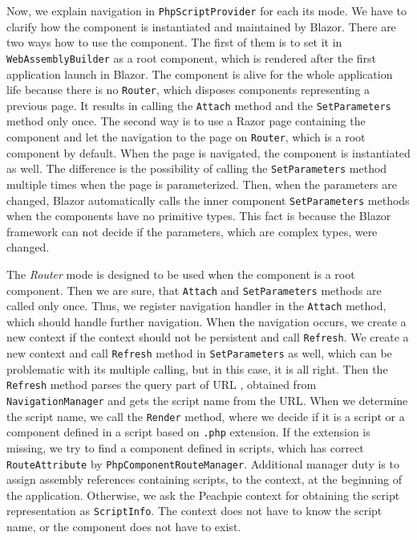 Now, we explain navigation in \texttt{PhpScriptProvider} for each its mode.
We have to clarify how the component is instantiated and maintained by Blazor.
There are two ways how to use the component.
The first of them is to set it in \texttt{WebAssemblyBuilder} as a root component,
which is rendered after the first application launch in Blazor.
The component is alive for the whole application life because there is no \texttt{Router}, which disposes components representing a previous page. 
It results in calling the \texttt{Attach} method and the \texttt{SetParameters} method only once.
The second way is to use a Razor page containing the component and let the navigation to the page on \texttt{Router}, which is a root component by default.
When the page is navigated, the component is instantiated as well.
The difference is the possibility of calling the \texttt{SetParameters} method multiple times when the page is parameterized.
Then, when the parameters are changed, Blazor automatically calls the inner component \texttt{SetParameters} methods when the components have no primitive types. 
This fact is because the Blazor framework can not decide if the parameters, which are complex types, were changed.
\par
The \textit{Router} mode is designed to be used when the component is a root component.
Then we are sure, that \texttt{Attach} and \texttt{SetParameters} methods are called only once.
Thus, we register navigation handler in the \texttt{Attach} method, which should handle further navigation.
When the navigation occurs, we create a new context if the context should not be persistent and call \texttt{Refresh}.
We create a new context and call \texttt{Refresh} method in \texttt{SetParameters} as well, which can be problematic with its multiple calling, but in this case, it is all right.
Then the \texttt{Refresh} method parses the query part of URL , obtained from \texttt{NavigationManager} and gets the script name from the URL.
When we determine the script name, we call the \texttt{Render} method, where we decide if it is a script or a component defined in a script based on \texttt{.php} extension.
If the extension is missing, we try to find a component defined in scripts, which has correct \texttt{RouteAttribute} by \texttt{PhpComponentRouteManager}.
Additional manager duty is to assign assembly references containing scripts, to the context, at the beginning of the application.
Otherwise, we ask the Peachpie context for obtaining the script representation as \texttt{ScriptInfo}.
The context does not have to know the script name, or the component does not have to exist. 
